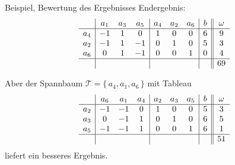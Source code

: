 \documentclass[accentcolor = tud11b, colorbacktitle, landscape, german, presentation, tudmathserif]{tudbeamer}
\begin{document}
			\begin{frame}{Beispiel, Bewertung des Ergebnisses}
				Endergebnis:
				\begin{equation*}
					\begin{array}{c|ccc|ccc|c||c}
						    & a_1 & a_3 & a_5 & a_4 & a_2 & a_6 & b & \omega \\ \hline
						a_4 & -1  &  1  &  0  &  1  &  0  &  0  & 6 &   9    \\
						a_2 & -1  &  1  & -1  &  0  &  1  &  0  & 5 &   3    \\
						a_6 &  0  &  1  & -1  &  0  &  0  &  1  & 0 &   4    \\ \hline
						    &     &     &     &     &     &     &   &   69
					\end{array}
				\end{equation*}
				
				Aber der Spannbaum \( \mathcal{T} = \{\, a_4, a_1, a_6 \,\} \) mit Tableau
				\begin{equation*}
					\begin{array}{c|ccc|ccc|c||c}
						    & a_6 & a_1 & a_4 & a_2 & a_3 & a_5 & b & \omega \\ \hline
						a_2 & -1  & -1  &  0  &  1  &  0  &  0  & 5 &   3    \\
						a_3 &  0  & -1  &  1  &  0  &  1  &  0  & 6 &   5    \\
						a_5 & -1  & -1  &  1  &  0  &  0  &  1  & 6 &   1    \\ \hline
						    &     &     &     &     &     &     &   &   51
					\end{array}
				\end{equation*}
				liefert ein besseres Ergebnis.
			\end{frame}
		
\end{document}
